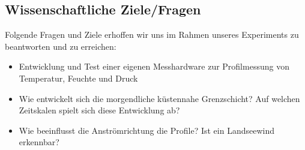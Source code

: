 \documentclass[a4paper,11pt,DIV=calc,tablecaptionabove,headinclude,twoside]{article}
\begin{document}
\subsection{Wissenschaftliche Ziele/Fragen}
Folgende Fragen und Ziele erhoffen wir uns im Rahmen unseres Experiments zu beantworten und zu erreichen:
\begin{itemize}
\item Entwicklung und Test einer eigenen Messhardware zur Profilmessung von
    Temperatur, Feuchte und Druck
\item Wie entwickelt sich die morgendliche küstennahe Grenzschicht? Auf welchen Zeitskalen spielt sich diese Entwicklung ab?
\item Wie beeinflusst die Anströmrichtung die Profile? Ist ein
    Landseewind erkennbar?
\end{itemize}
\newpage
\end{document}
